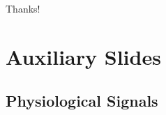 \documentclass{beamer}
\begin{document}
\begin{frame}
  \begin{center}
    \Huge
    Thanks!    
  \end{center}
\end{frame}




\appendix
\section{Auxiliary Slides}


\subsection{Physiological Signals}
\end{document}
